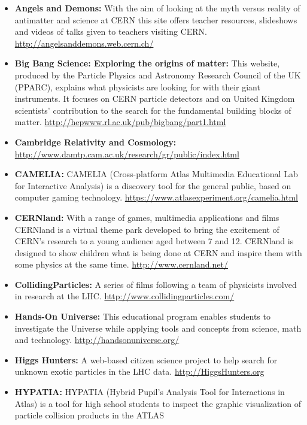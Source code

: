 \begin{itemize}
\item
  \textbf{Angels and Demons:} With the aim of looking at the myth versus
  reality of antimatter and science at CERN this site offers teacher
  resources, slideshows and videos of talks given to teachers visiting
  CERN. \url{http://angelsanddemons.web.cern.ch/}
\item
  \textbf{Big Bang Science: Exploring the origins of matter:} This
  website, produced by the Particle Physics and Astronomy Research
  Council of the UK (PPARC), explains what physicists are looking for
  with their giant instruments. It focuses on CERN particle detectors
  and on United Kingdom scientists' contribution to the search for the
  fundamental building blocks of matter.
  \url{http://hepwww.rl.ac.uk/pub/bigbang/part1.html}
\item
  \textbf{Cambridge Relativity and Cosmology:}
  \url{http://www.damtp.cam.ac.uk/research/gr/public/index.html}
\item
  \textbf{CAMELIA:} CAMELIA (Cross-platform Atlas Multimedia Educational
  Lab for Interactive Analysis) is a discovery tool for the general
  public, based on computer gaming technology.
  \url{https://www.atlasexperiment.org/camelia.html}
\item
  \textbf{CERNland:} With a range of games, multimedia applications and
  films CERNland is a virtual theme park developed to bring the
  excitement of CERN's research to a young audience aged between 7 and
  12. CERNland is designed to show children what is being done at CERN
  and inspire them with some physics at the same time.
  \url{http://www.cernland.net/}
\item
  \textbf{CollidingParticles:} A series of films following a team of
  physicists involved in research at the LHC.
  \url{http://www.collidingparticles.com/}
\item
  \textbf{Hands-On Universe:} This educational program enables students
  to investigate the Universe while applying tools and concepts from
  science, math and technology. \url{http://handsonuniverse.org/}
\item
  \textbf{Higgs Hunters:} A web-based citizen science project to help
  search for unknown exotic particles in the LHC data.
  \url{http://HiggsHunters.org}
\item
  \textbf{HYPATIA:} HYPATIA (Hybrid Pupil's Analysis Tool for
  Interactions in Atlas) is a tool for high school students to inspect
  the graphic visualization of particle collision products in the ATLAS

\end{itemize}
